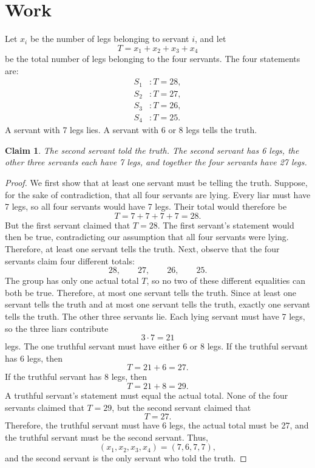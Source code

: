 \documentclass[11pt]{article}
\newtheorem*{claim}{Claim}
\begin{document}
\section*{Work} Let \(x_i\) be the number of legs belonging to servant \(i\), and let \[ T=x_1+x_2+x_3+x_4 \] be the total number of legs belonging to the four servants. The four statements are: \[ \begin{aligned} S_1 &: T=28,\\ S_2 &: T=27,\\ S_3 &: T=26,\\ S_4 &: T=25. \end{aligned} \] A servant with 7 legs lies. A servant with 6 or 8 legs tells the truth. \begin{claim} The second servant told the truth. The second servant has 6 legs, the other three servants each have 7 legs, and together the four servants have 27 legs. \end{claim} \begin{proof} We first show that at least one servant must be telling the truth. Suppose, for the sake of contradiction, that all four servants are lying. Every liar must have 7 legs, so all four servants would have 7 legs. Their total would therefore be \[ T=7+7+7+7=28. \] But the first servant claimed that \(T=28\). The first servant's statement would then be true, contradicting our assumption that all four servants were lying. Therefore, at least one servant tells the truth. Next, observe that the four servants claim four different totals: \[ 28,\qquad 27,\qquad 26,\qquad 25. \] The group has only one actual total \(T\), so no two of these different equalities can both be true. Therefore, at most one servant tells the truth. Since at least one servant tells the truth and at most one servant tells the truth, exactly one servant tells the truth. The other three servants lie. Each lying servant must have 7 legs, so the three liars contribute \[ 3\cdot 7=21 \] legs. The one truthful servant must have either 6 or 8 legs. If the truthful servant has 6 legs, then \[ T=21+6=27. \] If the truthful servant has 8 legs, then \[ T=21+8=29. \] A truthful servant's statement must equal the actual total. None of the four servants claimed that \(T=29\), but the second servant claimed that \[ T=27. \] Therefore, the truthful servant must have 6 legs, the actual total must be 27, and the truthful servant must be the second servant. Thus, \[ (x_1,x_2,x_3,x_4)=(7,6,7,7), \] and the second servant is the only servant who told the truth. \end{proof}
\end{document}
